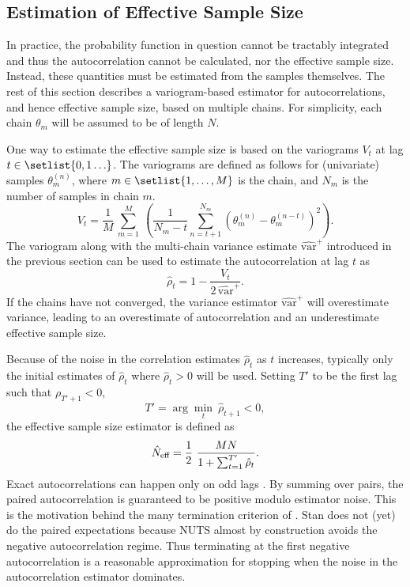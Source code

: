 \subsection{Estimation of Effective Sample Size}

In practice, the probability function in question cannot be tractably
integrated and thus the autocorrelation cannot be calculated, nor the
effective sample size.  Instead, these quantities must be estimated
from the samples themselves.  The rest of this section describes a
variogram-based estimator for autocorrelations, and hence effective sample
size, based on multiple chains. For simplicity, each chain
$\theta_m$ will be assumed to be of length $N$.

One way to estimate the effective sample size is based on the
variograms $V_t$ at lag $t \in \setlist{0,1\ldots}$.  The variograms are
defined as follows for (univariate) samples $\theta_m^{(n)}$, where $m \in
\setlist{1,\ldots,M}$ is the chain, and $N_m$ is the number of samples
in chain $m$.
\[
V_t =
\frac{1}{M}
\,
\sum_{m=1}^M
\
\left(
\frac{1}{N_m - t}
\sum_{n=t+1}^{N_m}
\left(
\theta_m^{(n)} - \theta_m^{(n-t)}
\right)^2
\right).
\]
%
The variogram along with the multi-chain variance estimate
$\widehat{\mbox{var}}^{+}$ introduced in the previous section can be
used to estimate the autocorrelation at lag $t$ as
\[
\hat{\rho}_t
= 1 - \frac{\displaystyle V_t}{
            \displaystyle 2 \, \widehat{\mbox{var}}^{+}}.
\]
If the chains have not converged, the variance estimator
$\widehat{\mbox{var}}^{+}$ will overestimate variance,
leading to an overestimate of autocorrelation and an underestimate
effective sample size.

Because of the noise in the correlation estimates $\hat{\rho}_t$ as $t$
increases, typically only the initial estimates of $\hat{\rho}_t$
where $\hat{\rho}_t > 0$ will be used.  Setting $T'$ to be the
first lag such that $\rho_{T' + 1} < 0$,
%
\[
T' = \arg\min_t \ \hat{\rho}_{t+1} < 0,
\]
the effective sample size estimator is defined as
\[
\hat{N}_{\mbox{\scriptsize eff}}
=
\frac{1}{2}
\
\frac{MN}
     {1 + \sum_{t=1}^{T'} \hat{\rho}_t}.
\]
%
Exact autocorrelations can happen only on odd lags \citep{Geyer:2011}.
By summing over pairs, the paired autocorrelation is guaranteed to be
positive modulo estimator noise.  This is the motivation behind the
many termination criterion of \cite{Geyer:2011}. Stan does not (yet)
do the paired expectations because NUTS almost by construction avoids
the negative autocorrelation regime.  Thus terminating at the first
negative autocorrelation is a reasonable approximation for stopping
when the noise in the autocorrelation estimator dominates.

